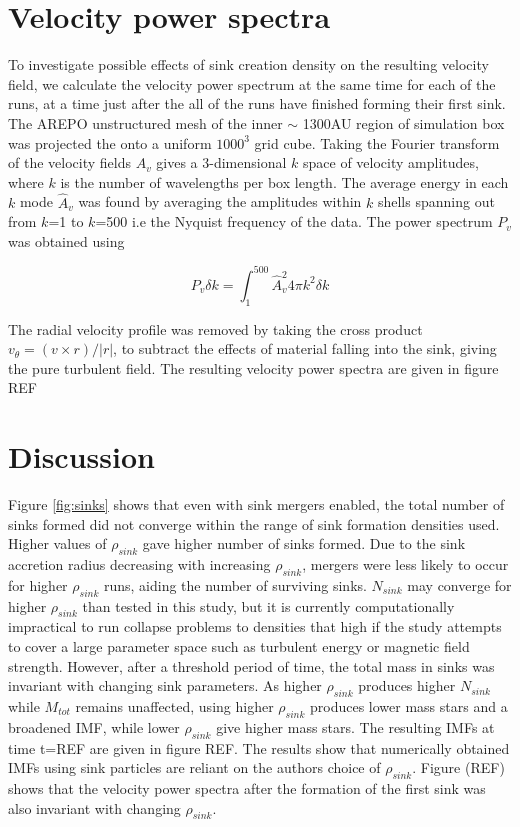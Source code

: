 \documentclass[fleqn,usenatbib]{mnras}
\begin{document}

\section{Velocity power spectra}
To investigate possible effects of sink creation density on the resulting velocity field, we calculate the velocity power spectrum at the same time for each of the runs, at a time just after the all of the runs have finished forming their first sink. The AREPO unstructured mesh of the inner $\sim$ 1300AU region of simulation box was projected the onto a uniform $1000^3$ grid cube. Taking the Fourier transform of the velocity fields $A_v$ gives a 3-dimensional $k$ space of velocity amplitudes, where $k$ is the number of wavelengths per box length. The average energy in each $k$ mode $\hat A_v$ was found by averaging the amplitudes within $k$ shells spanning out from $k$=1 to $k$=500 i.e the Nyquist frequency of the data. The power spectrum $P_v$ was obtained using

\begin{equation}
P_v \delta k = \int_{1}^{500} \hat A_v^2 4\pi k^2 \delta k 
\end{equation}

The radial velocity profile was removed by taking the cross product $v_\theta=(v \times r)/|r|$, to subtract the effects of material falling into the sink, giving the pure turbulent field. The resulting velocity power spectra are given in figure REF

\section{Discussion}
Figure \ref{fig:sinks} shows that even with sink mergers enabled, the total number of sinks formed did not converge within the range of sink formation densities used. Higher values of $\rho_{sink}$ gave higher number of sinks formed. Due to the sink accretion radius decreasing with increasing $\rho_{sink}$, mergers were less likely to occur for higher $\rho_{sink}$ runs, aiding the number of surviving sinks. $N_{sink}$ may converge for higher $\rho_{sink}$ than tested in this study, but it is currently computationally impractical to run collapse problems to densities that high if the study attempts to cover a large parameter space such as turbulent energy or magnetic field strength. However, after a threshold period of time, the total mass in sinks was invariant with changing sink parameters. As higher $\rho_{sink}$ produces higher $N_{sink}$ while $M_{tot}$ remains unaffected, using higher $\rho_{sink}$ produces lower mass stars and a broadened IMF, while lower $\rho_{sink}$ give higher mass stars. The resulting IMFs at time t=REF are given in figure REF. The results show that numerically obtained IMFs using sink particles are reliant on the authors choice of $\rho_{sink}$. Figure (REF) shows that the velocity power spectra after the formation of the first sink was also invariant with changing $\rho_{sink}$.
\end{document}
